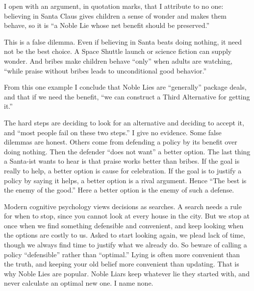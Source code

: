 
I open with an argument, in quotation marks, that I attribute to no one: believing in Santa Claus gives children a sense of wonder and makes them behave, so it is ``a Noble Lie whose net benefit should be preserved.''

This is a false dilemma. Even if believing in Santa beats doing nothing, it need not be the best choice. A Space Shuttle launch or science fiction can supply wonder. And bribes make children behave ``only'' when adults are watching, ``while praise without bribes leads to unconditional good behavior.'' 

From this one example I conclude that Noble Lies are ``generally'' package deals, and that if we need the benefit, ``we can construct a Third Alternative for getting it.''

The hard steps are deciding to look for an alternative and deciding to accept it, and ``most people fail on these two steps.'' I give no evidence. Some false dilemmas are honest. Others come from defending a policy by its benefit over doing nothing. Then the defender ``does not want'' a better option. The last thing a Santa-ist wants to hear is that praise works better than bribes. If the goal is really to help, a better option is cause for celebration. If the goal is to justify a policy by saying it helps, a better option is a rival argument. Hence ``The best is the enemy of the good.'' Here a better option is the enemy of such a defense. 

Modern cognitive psychology views decisions as searches. A search needs a rule for when to stop, since you cannot look at every house in the city. But we stop at once when we find something defensible and convenient, and keep looking when the options are costly to us. Asked to start looking again, we plead lack of time, though we always find time to justify what we already do.  So beware of calling a policy ``defensible'' rather than ``optimal.'' Lying is often more convenient than the truth, and keeping your old belief more convenient than updating. That is why Noble Lies are popular. Noble Liars keep whatever lie they started with, and never calculate an optimal new one. I name none.

